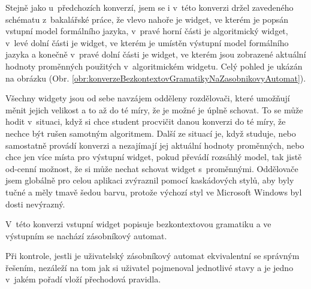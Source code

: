 
Stejně jako u~předchozích konverzí, jsem se i v~této konverzi držel zavedeného schématu z~bakalářské práce, že vlevo nahoře je widget, ve kterém je popsán vstupní model formálního jazyka, v~pravé horní části je algoritmický widget, v~levé dolní části je widget, ve kterém je umístěn výstupní model formálního jazyka a konečně v~pravé dolní části je widget, ve kterém jsou zobrazené aktuální hodnoty proměnných použitých v~algoritmickém widgetu. Celý pohled je ukázán na obrázku (Obr. \ref{obr:konverzeBezkontextovGramatikyNaZasobnikovyAutomat}). 

Všechny widgety jsou od sebe navzájem odděleny rozdělovači, které umožňují měnit jejich velikost a to až do té míry, že je možné je úplně schovat. To se může hodit v~situaci, když si chce student procvičit danou konverzi do té míry, že nechce být rušen samotným algoritmem. Další ze situací je, když studuje, nebo samostatně provádí konverzi a nezajímají jej aktuální hodnoty proměnných, nebo chce jen více místa pro výstupní widget, pokud převádí rozsáhlý model, tak jistě od-cenní možnost, že si může nechat schovat widget s~proměnnými. Oddělovače jsem globálně pro celou aplikaci zvýraznil pomocí kaskádových stylů, aby byly tučné a měly tmavě šedou barvu, protože výchozí styl ve Microsoft Windows byl dosti nevýrazný.

V~této konverzi vstupní widget popisuje bezkontextovou gramatiku a ve výstupním se nachází zásobníkový automat.

Při kontrole, jestli je uživatelský zásobníkový automat ekvivalentní se správným řešením, nezáleží na tom jak si uživatel pojmenoval jednotlivé stavy a je jedno v~jakém pořadí vloží přechodová pravidla.



